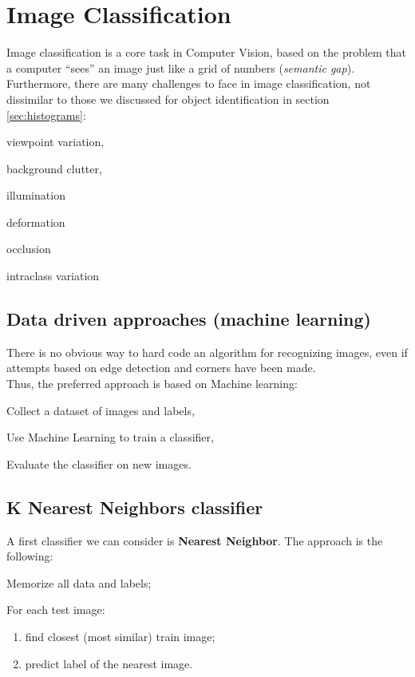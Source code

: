 \section{Image Classification}\label{sec:image-classification}

Image classification is a core task in Computer Vision, based on the problem that a computer ``sees'' an image just like a grid of numbers (\textit{semantic gap}).\\
Furthermore, there are many challenges to face in image classification, not dissimilar to those we discussed for object identification in section \ref{sec:histograms}:
\begin{myitem}
    \item viewpoint variation,
    \item background clutter,
    \item illumination
    \item deformation
    \item occlusion
    \item intraclass variation
\end{myitem}


\subsection{Data driven approaches (machine learning)}\label{sec:ic-ml}

There is no obvious way to hard code an algorithm for recognizing images, even if attempts based on edge detection and corners have been made.\\
Thus, the preferred approach is based on Machine learning:
\begin{myenum}
    \item Collect a dataset of images and labels,
    \item Use Machine Learning to train a classifier,
    \item Evaluate the classifier on new images.
\end{myenum}


\subsection{K Nearest Neighbors classifier}\label{sec:ic-knn}

A first classifier we can consider is \textbf{Nearest Neighbor}. The approach is the following:
\begin{myenum}
    \item Memorize all data and labels;
    \item For each test image:
    \begin{enumerate}
        \item find closest (most similar) train image;
        \item predict label of the nearest image.
    \end{enumerate}
\end{myenum}

